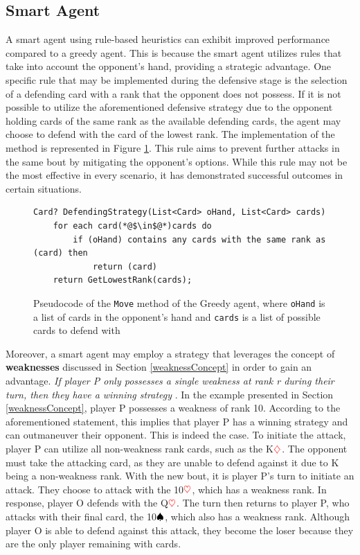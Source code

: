 \subsection{Smart Agent}
\label{smart}
A smart agent using rule-based heuristics can exhibit improved performance compared to a greedy agent. This is because the smart agent utilizes rules that take into account the opponent's hand, providing a strategic advantage. One specific rule that may be implemented during the defensive stage is the selection of a defending card with a rank that the opponent does not possess. If it is not possible to utilize the aforementioned defensive strategy due to the opponent holding cards of the same rank as the available defending cards, the agent may choose to defend with the card of the lowest rank.  The implementation of the method is represented in Figure \ref{fig:defStratSmart}. This rule aims to prevent further attacks in the same bout by mitigating the opponent's options. While this rule may not be the most effective in every scenario, it has demonstrated successful outcomes in certain situations.

\begin{figure}[h]
\captionsetup{justification=centering}
\begin{lstlisting}
Card? DefendingStrategy(List<Card> oHand, List<Card> cards)
    for each card(*@$\in$@*)cards do
        if (oHand) contains any cards with the same rank as (card) then
            return (card)
    return GetLowestRank(cards);
\end{lstlisting}
\caption{Pseudocode of the \texttt{Move} method of the Greedy agent, where \texttt{oHand} is a list of cards in the opponent's hand and \texttt{cards} is a list of possible cards to defend with}
\label{fig:defStratSmart}
\end{figure}

Moreover, a smart agent may employ a strategy that leverages the concept of \textbf{weaknesses} discussed in Section \ref{weaknessConcept} in order to gain an advantage. \textit{If player P only possesses a single weakness at rank r during their turn, then they have a winning strategy} \citep{Bonnet2016TheCO}. In the example presented in Section \ref{weaknessConcept}, player P possesses a weakness of rank 10. According to the aforementioned statement, this implies that player P has a winning strategy and can outmaneuver their opponent. This is indeed the case. To initiate the attack, player P can utilize all non-weakness rank cards, such as the K$\textcolor{red}{\diamondsuit}$. The opponent must take the attacking card, as they are unable to defend against it due to K being a non-weakness rank. With the new bout, it is player P's turn to initiate an attack. They choose to attack with the 10$\textcolor{red}{\heartsuit}$, which has a weakness rank. In response, player O defends with the Q$\textcolor{red}{\heartsuit}$. The turn then returns to player P, who attacks with their final card, the 10$\textcolor{black}{\spadesuit}$, which also has a weakness rank. Although player O is able to defend against this attack, they become the loser because they are the only player remaining with cards.


